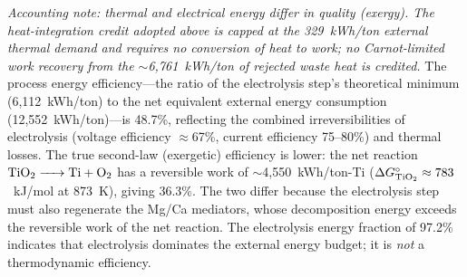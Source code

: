 \documentclass[11pt]{article}
\begin{document}
\emph{Accounting note: thermal and electrical energy differ in quality (exergy). The heat-integration credit adopted above is capped at the 329~kWh/ton external thermal demand and requires no conversion of heat to work; no Carnot-limited work recovery from the $\sim$6{,}761~kWh/ton of rejected waste heat is credited.} The process energy efficiency---the ratio of the electrolysis step's theoretical minimum (6{,}112~kWh/ton) to the net equivalent external energy consumption (12{,}552~kWh/ton)---is 48.7\%, reflecting the combined irreversibilities of electrolysis (voltage efficiency $\approx$67\%, current efficiency 75--80\%) and thermal losses. The true second-law (exergetic) efficiency is lower: the net reaction $\ce{TiO2 -> Ti + O2}$ has a reversible work of $\sim$4{,}550~kWh/ton-Ti ($\Delta G^{\circ}_{\ce{TiO2}} \approx 783$~kJ/mol at 873~K), giving 36.3\%. The two differ because the electrolysis step must also regenerate the Mg/Ca mediators, whose decomposition energy exceeds the reversible work of the net reaction. The electrolysis energy fraction of 97.2\% indicates that electrolysis dominates the external energy budget; it is \emph{not} a thermodynamic efficiency.
\end{document}

